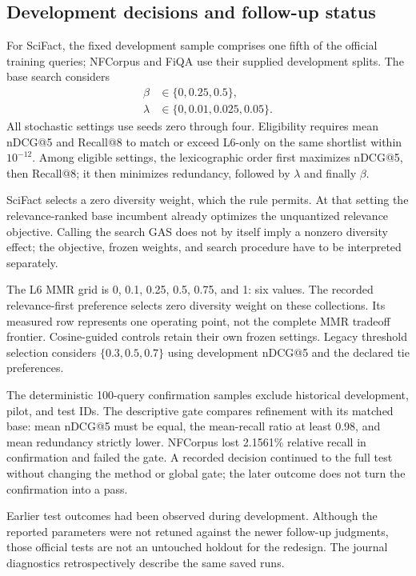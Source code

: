 \subsection{Development decisions and follow-up status}
For SciFact, the fixed development sample comprises one fifth of the official training queries; NFCorpus and FiQA use their supplied development splits. The base search considers
\begin{equation}
\begin{aligned}
\beta&\in\{0,0.25,0.5\},\\
\lambda&\in\{0,0.01,0.025,0.05\}.
\end{aligned}
\label{eq:development_grids}
\end{equation}
All stochastic settings use seeds zero through four. Eligibility requires mean nDCG@5 and Recall@8 to match or exceed L6-only on the same shortlist within $10^{-12}$. Among eligible settings, the lexicographic order first maximizes nDCG@5, then Recall@8; it then minimizes redundancy, followed by $\lambda$ and finally $\beta$.

SciFact selects a zero diversity weight, which the rule permits. At that setting the relevance-ranked base incumbent already optimizes the unquantized relevance objective. Calling the search GAS does not by itself imply a nonzero diversity effect; the objective, frozen weights, and search procedure have to be interpreted separately.

The L6 MMR grid is 0, 0.1, 0.25, 0.5, 0.75, and 1: six values. The recorded relevance-first preference selects zero diversity weight on these collections. Its measured row represents one operating point, not the complete MMR tradeoff frontier. Cosine-guided controls retain their own frozen settings. Legacy threshold selection considers $\{0.3,0.5,0.7\}$ using development nDCG@5 and the declared tie preferences.

The deterministic 100-query confirmation samples exclude historical development, pilot, and test IDs. The descriptive gate compares refinement with its matched base: mean nDCG@5 must be equal, the mean-recall ratio at least 0.98, and mean redundancy strictly lower. NFCorpus lost 2.1561\% relative recall in confirmation and failed the gate. A recorded decision continued to the full test without changing the method or global gate; the later outcome does not turn the confirmation into a pass.

Earlier test outcomes had been observed during development. Although the reported parameters were not retuned against the newer follow-up judgments, those official tests are not an untouched holdout for the redesign. The journal diagnostics retrospectively describe the same saved runs.

